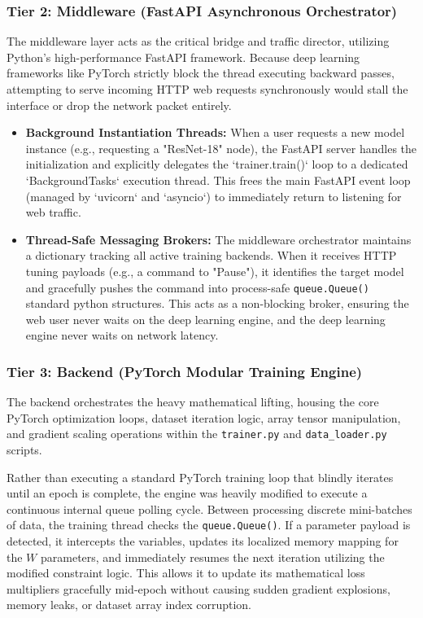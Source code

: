 \documentclass[12pt,a4paper]{article}
\begin{document}
\subsubsection{Tier 2: Middleware (FastAPI Asynchronous Orchestrator)}
The middleware layer acts as the critical bridge and traffic director, utilizing Python's high-performance FastAPI framework. Because deep learning frameworks like PyTorch strictly block the thread executing backward passes, attempting to serve incoming HTTP web requests synchronously would stall the interface or drop the network packet entirely.
\begin{itemize}
    \item \textbf{Background Instantiation Threads:} When a user requests a new model instance (e.g., requesting a "ResNet-18" node), the FastAPI server handles the initialization and explicitly delegates the `trainer.train()` loop to a dedicated `BackgroundTasks` execution thread. This frees the main FastAPI event loop (managed by `uvicorn` and `asyncio`) to immediately return to listening for web traffic.
    \item \textbf{Thread-Safe Messaging Brokers:} The middleware orchestrator maintains a dictionary tracking all active training backends. When it receives HTTP tuning payloads (e.g., a command to "Pause"), it identifies the target model and gracefully pushes the command into process-safe \texttt{queue.Queue()} standard python structures. This acts as a non-blocking broker, ensuring the web user never waits on the deep learning engine, and the deep learning engine never waits on network latency.
\end{itemize}

\subsubsection{Tier 3: Backend (PyTorch Modular Training Engine)}
The backend orchestrates the heavy mathematical lifting, housing the core PyTorch optimization loops, dataset iteration logic, array tensor manipulation, and gradient scaling operations within the \texttt{trainer.py} and \texttt{data\_loader.py} scripts. 

Rather than executing a standard PyTorch training loop that blindly iterates until an epoch is complete, the engine was heavily modified to execute a continuous internal queue polling cycle. Between processing discrete mini-batches of data, the training thread checks the \texttt{queue.Queue()}. If a parameter payload is detected, it intercepts the variables, updates its localized memory mapping for the $W$ parameters, and immediately resumes the next iteration utilizing the modified constraint logic. This allows it to update its mathematical loss multipliers gracefully mid-epoch without causing sudden gradient explosions, memory leaks, or dataset array index corruption.
\end{document}

